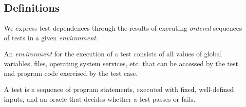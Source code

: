 \subsection{Definitions}
\label{sec:definitions}

We express test dependences through the results of executing
\emph{ordered} sequences of tests in a given \emph{environment}.


\begin{definition}[Environment]
An \emph{environment} \env for the execution of a test
consists of all values of global variables, files,
operating
system services, etc. that
can be accessed by the test and program code exercised by the test
case.
%
\end{definition}

\begin{definition}[Test]
%

A test is a sequence of program statements, executed with fixed,
well-defined inputs, and an oracle that
decides whether a test passes or fails.
\end{definition}


